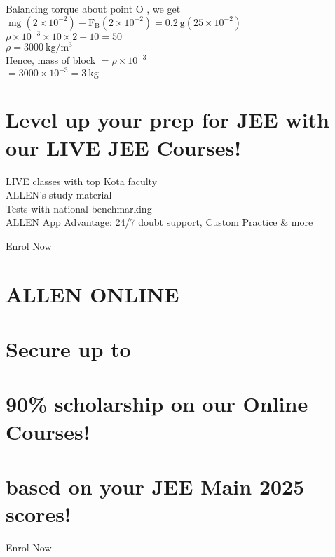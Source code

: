 \documentclass[10pt]{article}
\begin{document}
Balancing torque about point O , we get\\
\(\operatorname{mg}\left(2 \times 10^{-2}\right)-\mathrm{F}_{\mathrm{B}}\left(2 \times 10^{-2}\right)=0.2 \mathrm{~g}\left(25 \times 10^{-2}\right)\)\\
\(\rho \times 10^{-3} \times 10 \times 2-10=50\)\\
\(\rho=3000 \mathrm{~kg} / \mathrm{m}^{3}\)\\
Hence, mass of block \(=\rho \times 10^{-3}\)\\
\(=3000 \times 10^{-3}=3 \mathrm{~kg}\)

\section*{Level up your prep for JEE with our LIVE JEE Courses!}
LIVE classes with top Kota faculty\\
ALLEN's study material\\
Tests with national benchmarking\\
ALLEN App Advantage: 24/7 doubt support, Custom Practice \& more

Enrol Now

\section*{ALLEN ONLINE}
\section*{Secure up to}
\section*{90\% scholarship on our Online Courses!}
\section*{based on your JEE Main 2025 scores!}
Enrol Now
\end{document}
